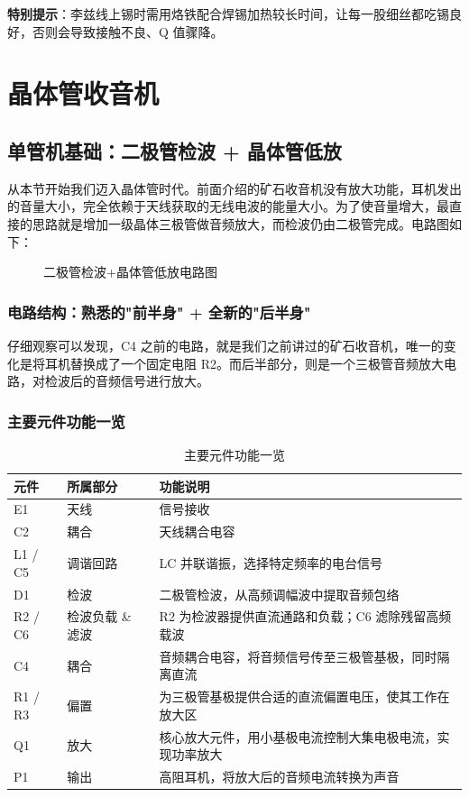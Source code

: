 \documentclass[12pt,UTF8]{ctexbook}
\begin{document}
\textbf{特别提示}：李兹线上锡时需用烙铁配合焊锡加热较长时间，让每一股细丝都吃锡良好，否则会导致接触不良、Q 值骤降。


\part{晶体管收音机}
\label{part:transistor-radio}

\chapter{单管机基础：二极管检波 + 晶体管低放}
\label{chap:single-transistor-radio}

从本节开始我们迈入晶体管时代。前面介绍的矿石收音机没有放大功能，耳机发出的音量大小，完全依赖于天线获取的无线电波的能量大小。为了使音量增大，最直接的思路就是增加一级晶体三极管做音频放大，而检波仍由二极管完成。电路图如下：

\begin{figure}[H]
	\centering
	\caption{二极管检波+晶体管低放电路图}
	\label{fig:diode-transistor-circuit}
\end{figure}

\section{电路结构：熟悉的"前半身" + 全新的"后半身"}

仔细观察可以发现，C4 之前的电路，就是我们之前讲过的矿石收音机，唯一的变化是将耳机替换成了一个固定电阻 R2。而后半部分，则是一个三极管音频放大电路，对检波后的音频信号进行放大。

\section{主要元件功能一览}

\begin{table}[H]
	\centering
	\begin{tabular}{|l|l|l|}
		\hline
		元件 & 所属部分 & 功能说明 \\
		\hline
		E1 & 天线 & 信号接收 \\
		\hline
		C2 & 耦合 & 天线耦合电容 \\
		\hline
		L1 / C5 & 调谐回路 & LC 并联谐振，选择特定频率的电台信号 \\
		\hline
		D1 & 检波 & 二极管检波，从高频调幅波中提取音频包络 \\
		\hline
		R2 / C6 & 检波负载 \& 滤波 & R2 为检波器提供直流通路和负载；C6 滤除残留高频载波 \\
		\hline
		C4 & 耦合 & 音频耦合电容，将音频信号传至三极管基极，同时隔离直流 \\
		\hline
		R1 / R3 & 偏置 & 为三极管基极提供合适的直流偏置电压，使其工作在放大区 \\
		\hline
		Q1 & 放大 & 核心放大元件，用小基极电流控制大集电极电流，实现功率放大 \\
		\hline
		P1 & 输出 & 高阻耳机，将放大后的音频电流转换为声音 \\
		\hline
	\end{tabular}
	\caption{主要元件功能一览}
	\label{tab:component-functions}
\end{table}
\end{document}

